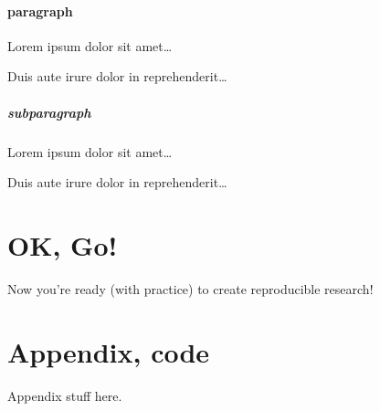 \documentclass[letterpaper,12pt]{article}\usepackage[]{graphicx}\usepackage[]{color}
\begin{document}
\paragraph{paragraph}
Lorem ipsum dolor sit amet\ldots

Duis aute irure dolor in reprehenderit\ldots

\subparagraph{subparagraph}
Lorem ipsum dolor sit amet\ldots

Duis aute irure dolor in reprehenderit\ldots

\section{OK, Go!}

Now you're ready (with practice) to create reproducible research!

\appendix     %

\section{Appendix, code}

Appendix stuff here.
\end{document}
